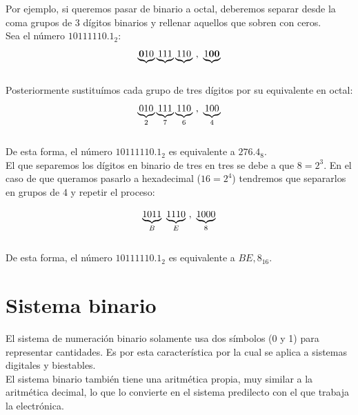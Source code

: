 \documentclass[12pt]{article}
\begin{document}
				Por ejemplo, si queremos pasar de binario a octal, deberemos separar desde la coma grupos de 3 dígitos binarios y rellenar aquellos que sobren con ceros.\\
				
				Sea el número $10 111 110.1_2$:\\
				
				\begin{equation}
					\notag
					\underbrace{\textbf{0}10} \underbrace{111} \underbrace{110} ~,~ \underbrace{1\textbf{0}\textbf{0}}
				\end{equation}\\
				
				Posteriormente sustituímos cada grupo de tres dígitos por su equivalente en octal:\\
				
				\begin{equation}
					\notag
					\underbrace{010}_2 \underbrace{111}_7 \underbrace{110}_6 ~,~ \underbrace{100}_4
				\end{equation}\\
				
				De esta forma, el número $10111110.1_2$ es equivalente a $276.4_8$.\\
				
				El que separemos los dígitos en binario de tres en tres se debe a que $8 = 2^3$. En el caso de que queramos pasarlo a hexadecimal ($16 = 2^4$) tendremos que separarlos en grupos de 4 y repetir el proceso:
				
				\begin{equation}
					\notag
					\underbrace{1011}_B ~ \underbrace{1110}_E ~,~ \underbrace{1000}_8
				\end{equation}\\
				
				De esta forma, el número $10111110.1_2$ es equivalente a $BE,8_{16}$.\\
				
				\newpage
			
		\section{Sistema binario}
		
		El sistema de numeración binario solamente usa dos símbolos (0 y 1) para representar cantidades. Es por esta característica por la cual se aplica a sistemas digitales y biestables.\\
		
		El sistema binario también tiene una aritmética propia, muy similar a la aritmética decimal, lo que lo convierte en el sistema predilecto con el que trabaja la electrónica.\\
		
\end{document}
